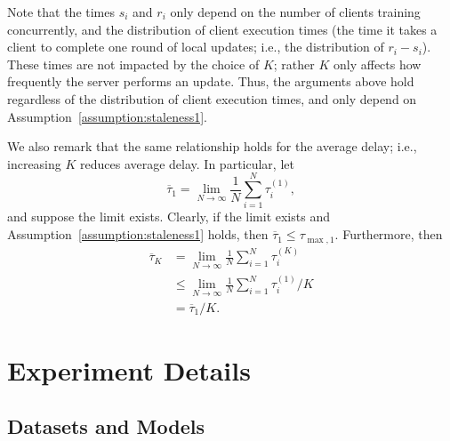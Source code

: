 \documentclass[twoside]{article}
\begin{document}
Note that the times $s_i$ and $r_i$ only depend on the number of clients training concurrently, and the distribution of client execution times (the time it takes a client to complete one round of local updates; i.e., the distribution of $r_i - s_i$). These times are not impacted by the choice of $K$; rather $K$ only affects how frequently the server performs an update. Thus, the arguments above hold regardless of the distribution of client execution times, and only depend on  Assumption~\ref{assumption:staleness1}.

We also remark that the same relationship holds for the average delay; i.e., increasing $K$ reduces average delay. In particular, let
\newcommand{\taubar}{\overline{\tau}}
\[
\taubar_1 = \lim_{N \rightarrow \infty} \frac{1}{N} \sum_{i=1}^N \tau_i^{(1)},
\]
and suppose the limit exists. Clearly, if the limit exists and Assumption~\ref{assumption:staleness1} holds, then $\taubar_1 \le \tau_{\max, 1}$. Furthermore, then
\begin{align*}
\taubar_K &= \lim_{N \rightarrow \infty} \frac{1}{N} \sum_{i=1}^N \tau_i^{(K)} \\
&\le \lim_{N \rightarrow \infty} \frac{1}{N} \sum_{i=1}^N \tau_i^{(1)} / K \\
&= \taubar_1 / K.
\end{align*}


\section{Experiment Details}
\label{sec:appendix_exp}

\subsection{Datasets and Models}
\label{sec:appendix_data_model}


\end{document}
